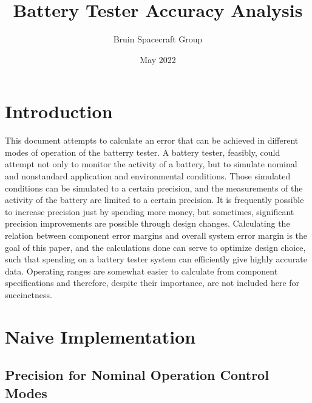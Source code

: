 \documentclass{article}
\title{Battery Tester Accuracy Analysis}
\author{Bruin Spacecraft Group}
\date{May 2022}
\begin{document}
\maketitle
\newpage
\section{Introduction}
This document attempts to calculate an error that can be achieved in different modes of operation of the batterry tester. A battery tester, feasibly, could attempt not only to monitor the activity of a battery, but to simulate nominal and nonstandard application and environmental conditions. Those simulated conditions can be simulated to a certain precision, and the measurements of the activity of the battery are limited to a certain precision. It is frequently possible to increase precision just by spending more money, but sometimes, significant precision improvements are possible through design changes. Calculating the relation between component error margins and overall system error margin is the goal of this paper, and the calculations done can serve to optimize design choice, such that spending on a battery tester system can efficiently give highly accurate data. Operating ranges are somewhat easier to calculate from component specifications and therefore, despite their importance, are not included here for succinctness.
\newpage
\section{Naive Implementation}
\subsection{Precision for Nominal Operation Control Modes}
\end{document}
